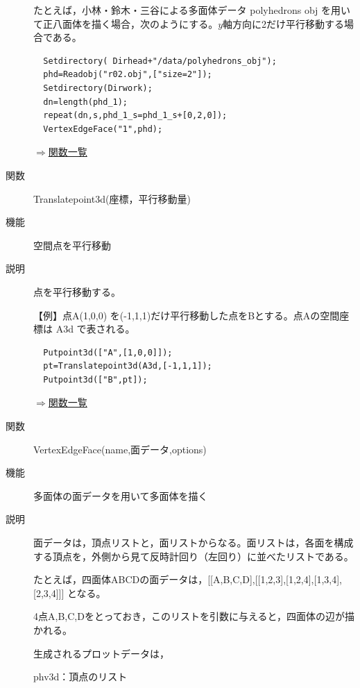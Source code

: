 \documentclass[papersize,a4paper,12pt,uplatex]{jsarticle}
\begin{document}
\begin{description}
たとえば，小林・鈴木・三谷による多面体データ  polyhedrons obj  を用いて正八面体を描く場合，次のようにする。$y$軸方向に2だけ平行移動する場合である。

\begin{verbatim}
  Setdirectory( Dirhead+"/data/polyhedrons_obj");
  phd=Readobj("r02.obj",["size=2"]);
  Setdirectory(Dirwork);
  dn=length(phd_1);
  repeat(dn,s,phd_1_s=phd_1_s+[0,2,0]);
  VertexEdgeFace("1",phd);
\end{verbatim}
      \begin{center}  \end{center}

\begin{flushright} \hyperlink{functionlist}{$\Rightarrow$関数一覧}\end{flushright}

\hypertarget{translatepoint3d}{}
\item[関数]  Translatepoint3d(座標，平行移動量)
\item[機能]  空間点を平行移動
\item[説明]  点を平行移動する。

\vspace{\baselineskip}
【例】点A(1,0,0) を(-1,1,1)だけ平行移動した点をBとする。点Aの空間座標は A3d で表される。 
\begin{verbatim}
  Putpoint3d(["A",[1,0,0]]);
  pt=Translatepoint3d(A3d,[-1,1,1]);
  Putpoint3d(["B",pt]);
\end{verbatim}
\vspace{\baselineskip}
\begin{flushright} \hyperlink{functionlist}{$\Rightarrow$関数一覧}\end{flushright}

\hypertarget{vertexedgeface}{}
\item[関数]  VertexEdgeFace(name,面データ,options)
\item[機能]  多面体の面データを用いて多面体を描く
\item[説明]  面データは，頂点リストと，面リストからなる。面リストは，各面を構成する頂点を，外側から見て反時計回り（左回り）に並べたリストである。

たとえば，四面体ABCDの面データは，[[A,B,C,D],[[1,2,3],[1,2,4],[1,3,4],[2,3,4]]] となる。

4点A,B,C,Dをとっておき，このリストを引数に与えると，四面体の辺が描かれる。

生成されるプロットデータは，

phv3d：頂点のリスト


\end{description}
\end{document}
